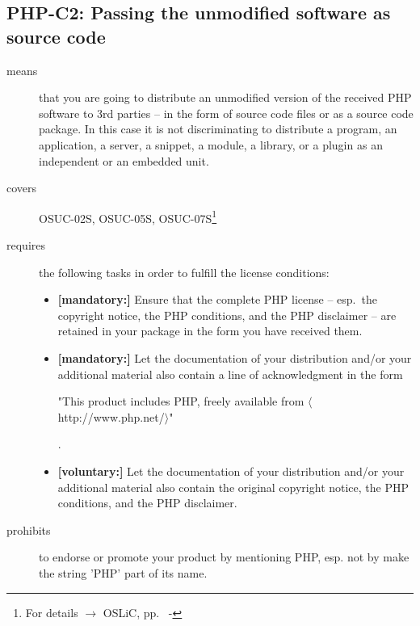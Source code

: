 \subsection{PHP-C2: Passing the unmodified software as source code}
\label{OSUC-02S-PHP} \label{OSUC-05S-PHP} \label{OSUC-07S-PHP} 

\begin{description}
\item[means] that you are going to distribute an unmodified version of the
received PHP software to 3rd parties -- in the form of source code files or as a
source code package. In this case it is not discriminating to distribute a
program, an application, a server, a snippet, a module, a library, or a plugin
as an independent or an embedded unit.

\item[covers] OSUC-02S, OSUC-05S, OSUC-07S\footnote{For details $\rightarrow$
OSLiC, pp.\ \pageref{OSUC-02S-DEF} - \pageref{OSUC-07S-DEF}}

\item[requires] the following tasks in order to fulfill the license conditions:
\begin{itemize}
  
  \item \textbf{[mandatory:]} Ensure that the complete PHP license -- esp.\
  the copyright notice, the PHP conditions, and the PHP disclaimer -- are
  retained in your package in the form you have received them.
  
  \item \textbf{[mandatory:]} Let the documentation of your distribution and/or
  your additional material also contain a line of acknowledgment in the form
  \begin{footnotesize}"This product includes PHP, freely available from
  $\langle$http://www.php.net/$\rangle$"\end{footnotesize}.
  
  \item \textbf{[voluntary:]} Let the documentation of your distribution and/or
  your additional material also contain the original copyright notice, the PHP
  conditions, and the PHP disclaimer.
  
\end{itemize}

\item[prohibits] to endorse or promote your product by mentioning PHP, esp. not
by make the string 'PHP' part of its name.

\end{description}


